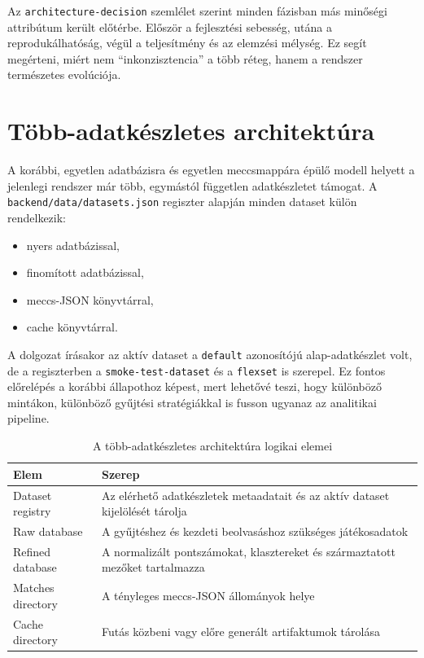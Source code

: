 \documentclass[a4paper,12pt]{report}
\begin{document}
Az \texttt{architecture-decision} szemlélet szerint minden fázisban más minőségi attribútum került előtérbe. Először a fejlesztési sebesség, utána a reprodukálhatóság, végül a teljesítmény és az elemzési mélység. Ez segít megérteni, miért nem ``inkonzisztencia'' a több réteg, hanem a rendszer természetes evolúciója.

\section{Több-adatkészletes architektúra}

A korábbi, egyetlen adatbázisra és egyetlen meccsmappára épülő modell helyett a jelenlegi rendszer már több, egymástól független adatkészletet támogat. A \texttt{backend/data/datasets.json} regiszter alapján minden dataset külön rendelkezik:

\begin{itemize}
    \item nyers adatbázissal,
    \item finomított adatbázissal,
    \item meccs-JSON könyvtárral,
    \item cache könyvtárral.
\end{itemize}

A dolgozat írásakor az aktív dataset a \texttt{default} azonosítójú alap-adatkészlet volt, de a regiszterben a \texttt{smoke-test-dataset} és a \texttt{flexset} is szerepel. Ez fontos előrelépés a korábbi állapothoz képest, mert lehetővé teszi, hogy különböző mintákon, különböző gyűjtési stratégiákkal is fusson ugyanaz az analitikai pipeline.

\begin{table}[H]
\centering
\caption{A több-adatkészletes architektúra logikai elemei}
\begin{tabularx}{\textwidth}{>{\raggedright\arraybackslash}p{3.2cm}X}
\toprule
\textbf{Elem} & \textbf{Szerep} \\
\midrule
Dataset registry & Az elérhető adatkészletek metaadatait és az aktív dataset kijelölését tárolja \\
Raw database & A gyűjtéshez és kezdeti beolvasáshoz szükséges játékosadatok \\
Refined database & A normalizált pontszámokat, klasztereket és származtatott mezőket tartalmazza \\
Matches directory & A tényleges meccs-JSON állományok helye \\
Cache directory & Futás közbeni vagy előre generált artifaktumok tárolása \\
\bottomrule
\end{tabularx}
\end{table}
\end{document}
